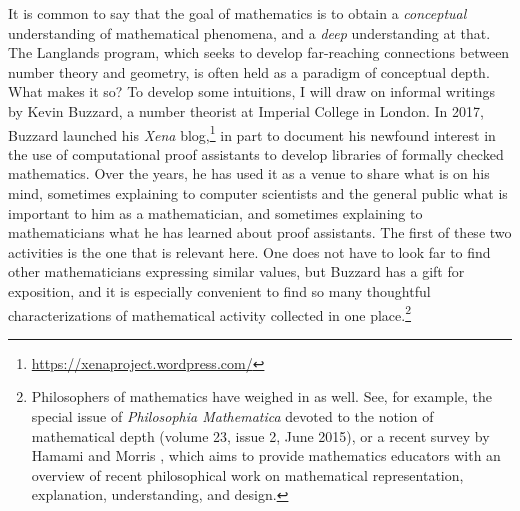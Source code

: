 \documentclass[12pt]{amsart}
\theoremstyle{definition}
\theoremstyle{remark}
\numberwithin{equation}{section}
\begin{document}
It is common to say that the goal of mathematics is to obtain a \emph{conceptual} understanding of mathematical phenomena, and a \emph{deep} understanding at that. The Langlands program, which seeks to develop far-reaching connections between number theory and geometry, is often held as a paradigm of conceptual depth. What makes it so? To develop some intuitions, I will draw on informal writings by Kevin Buzzard, a number theorist at Imperial College in London. In 2017, Buzzard launched his \emph{Xena} blog,\footnote{\url{https://xenaproject.wordpress.com/}} in part to document his newfound interest in the use of computational proof assistants to develop libraries of formally checked mathematics. Over the years, he has used it as a venue to share what is on his mind, sometimes explaining to computer scientists and the general public what is important to him as a mathematician, and sometimes explaining to mathematicians what he has learned about proof assistants. The first of these two activities is the one that is relevant here. One does not have to look far to find other mathematicians expressing similar values, but Buzzard has a gift for exposition, and it is especially convenient to find so many thoughtful characterizations of mathematical activity collected in one place.\footnote{Philosophers of mathematics have weighed in as well. See, for example, the special issue of \emph{Philosophia Mathematica} devoted to the notion of mathematical depth (volume 23, issue 2, June 2015), or a recent survey by Hamami and Morris \cite{hamami:morris:20}, which aims to provide mathematics educators with an overview of recent philosophical work on mathematical representation, explanation, understanding, and design.}
\end{document}
